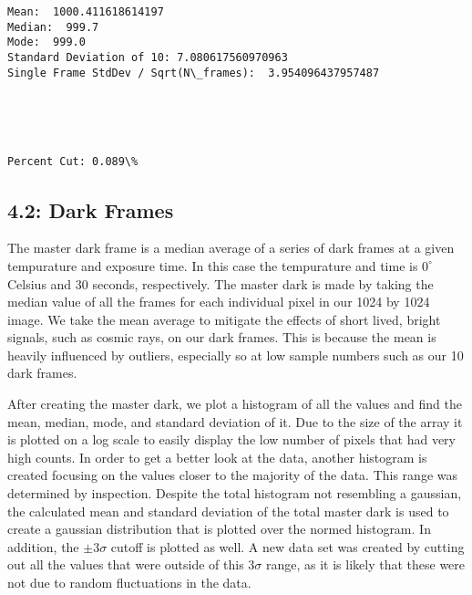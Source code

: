 \documentclass[11pt]{article}
\begin{document}
    \begin{Verbatim}[commandchars=\\\{\}]
Mean:  1000.411618614197 
Median:  999.7 
Mode:  999.0 
Standard Deviation of 10: 7.080617560970963
Single Frame StdDev / Sqrt(N\_frames):  3.954096437957487

    \end{Verbatim}

    \begin{center}
    \end{center}
    { \hspace*{\fill} \\}
    
    \begin{center}
    \end{center}
    { \hspace*{\fill} \\}
    
    \begin{Verbatim}[commandchars=\\\{\}]
Percent Cut: 0.089\%

    \end{Verbatim}

    \subsection{4.2: Dark Frames}\label{dark-frames}

    The master dark frame is a median average of a series of dark frames at
a given tempurature and exposure time. In this case the tempurature and
time is \(0^\circ\) Celsius and \(30\) seconds, respectively. The master
dark is made by taking the median value of all the frames for each
individual pixel in our 1024 by 1024 image. We take the mean average to
mitigate the effects of short lived, bright signals, such as cosmic
rays, on our dark frames. This is because the mean is heavily influenced
by outliers, especially so at low sample numbers such as our 10 dark
frames.

After creating the master dark, we plot a histogram of all the values
and find the mean, median, mode, and standard deviation of it. Due to
the size of the array it is plotted on a log scale to easily display the
low number of pixels that had very high counts. In order to get a better
look at the data, another histogram is created focusing on the values
closer to the majority of the data. This range was determined by
inspection. Despite the total histogram not resembling a gaussian, the
calculated mean and standard deviation of the total master dark is used
to create a gaussian distribution that is plotted over the normed
histogram. In addition, the \(\pm3\sigma\) cutoff is plotted as well. A
new data set was created by cutting out all the values that were outside
of this \(3\sigma\) range, as it is likely that these were not due to
random fluctuations in the data.
\end{document}
